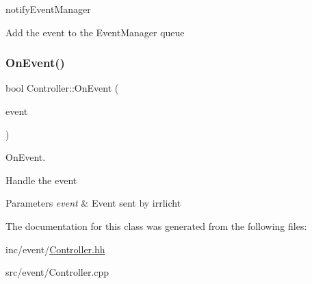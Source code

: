 notify\+Event\+Manager 

Add the event to the Event\+Manager queue \mbox{\label{classController_a81b6f6d728022c92b064866759a7d4d9}} 
\subsubsection{\texorpdfstring{On\+Event()}{OnEvent()}}
{\footnotesize\ttfamily bool Controller\+::\+On\+Event (\begin{DoxyParamCaption}\item[{const irr\+::\+S\+Event \&}]{event }\end{DoxyParamCaption})\hspace{0.3cm}{\ttfamily [virtual]}}



On\+Event. 

Handle the event


\begin{DoxyParams}{Parameters}
{\em event} & Event sent by irrlicht \\
\hline
\end{DoxyParams}


The documentation for this class was generated from the following files\+:\begin{DoxyCompactItemize}
\item 
inc/event/\hyperlink{Controller_8hh}{Controller.\+hh}\item 
src/event/Controller.\+cpp\end{DoxyCompactItemize}
